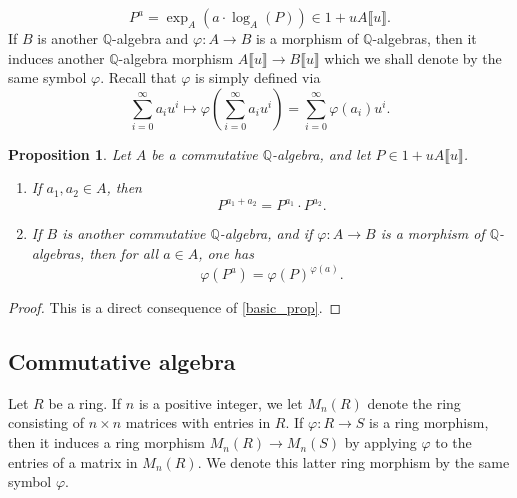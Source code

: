 \documentclass[11pt]{amsart}
\newtheorem{proposition}[theorem]{Proposition}
\numberwithin{equation}{section}
\theoremstyle{remark}
\theoremstyle{definition}
\begin{document}
\begin{equation} \label{exponent}
P^{a} = \exp_{A} \left( a \cdot \log_{A}(P) \right) \in 1 + uA \llbracket u \rrbracket. 
\end{equation}
If $B$ is another $\mathbb{Q}$-algebra and $\varphi:A \rightarrow B$ is a morphism of $\mathbb{Q}$-algebras, then it induces another $\mathbb{Q}$-algebra morphism $A\llbracket u \rrbracket \rightarrow B\llbracket u \rrbracket$ which we shall denote by the same symbol $\varphi$.  Recall that $\varphi$ is simply defined via
$$\sum_{i=0}^{\infty} a_{i}u^{i} \mapsto \varphi \left( \sum_{i=0}^{\infty} a_{i}u^{i}\right) = \sum_{i=0}^{\infty} \varphi(a_{i})u^{i}.$$
\begin{proposition} \label{exp_beh}
Let $A$ be a commutative $\mathbb{Q}$-algebra, and let $P \in 1 + uA\llbracket u \rrbracket$.
\begin{enumerate}
\item If $a_{1}, a_{2} \in A$, then 
$$P^{a_{1} + a_{2}}  = P^{a_{1}} \cdot P^{a_{2}}. $$
\item If $B$ is another commutative $\mathbb{Q}$-algebra, and if $\varphi:A \rightarrow B$ is a morphism of $\mathbb{Q}$-algebras, then for all $a \in A$, one has
$$\varphi \left(P^{a} \right) = \varphi(P)^{\varphi(a)}.$$
\end{enumerate}
\end{proposition}
\begin{proof}
This is a direct consequence of \cref{basic_prop}.
\end{proof}

\subsection{Commutative algebra} \label{com_alg}
Let $R$ be a ring.  If $n$ is a positive integer, we let $M_{n}(R)$ denote the ring consisting of $n \times n$ matrices with entries in $R$.  If $\varphi:R \rightarrow S$ is a ring morphism, then it induces a ring morphism $M_{n}(R) \rightarrow M_{n}(S)$ by applying $\varphi$ to the entries of a matrix in $M_{n}(R)$.  We denote this latter ring morphism by the same symbol $\varphi$.  
\end{document}
